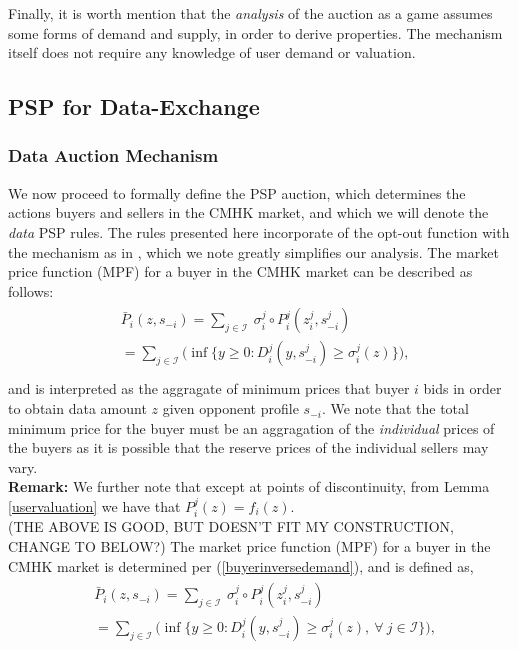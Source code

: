 \documentclass[sigconf, anonymous]{acmart}
\newcommand{\mcI}{\mathcal{I}}
\newcommand{\g}{\sigma}
\theoremstyle{definition}
\begin{document}
 
Finally, it is worth mention that the \emph{analysis} of the auction as
a game assumes some forms of demand and supply, in order to derive properties.
The mechanism itself does not require any knowledge of user demand or
valuation. 
\subsection{PSP for Data-Exchange}

\subsubsection{Data Auction Mechanism}\label{datamechanism}
We now proceed to formally define the PSP auction, which determines the actions 
buyers and sellers in the CMHK market, and which we will denote the \emph{data}
PSP rules. The rules presented here incorporate of the opt-out function with the
mechanism as in \cite{lazar}, which we note greatly simplifies our
analysis. 
The market price function (MPF) for a buyer in the CMHK market
can be described as follows:
\begin{align}\label{dataprice}
\begin{split}
    &\bar{P}_i(z, s_{-i}) =\displaystyle\sum_{j\in\mcI} \ \g_i^j \circ P_i^j(z_i^j,
s_{-i}^j) \\
    &= \sum_{j\in\mcI}\bigg(\inf\bigg\lbrace y\ge 0 : 
    {D_i^j}(y,s_{-i}^j) \ge \g_i^j(z) \bigg\rbrace \bigg),\\
\end{split}
\end{align}
and is interpreted as the aggragate of minimum prices that buyer $i$ bids in
order to obtain
data amount $z$ given opponent profile $s_{-i}$. We note that
the total minimum price for the buyer must be an aggragation of the
\emph{individual} prices of the buyers as it is possible that the reserve prices
of the individual sellers may vary.\\
\textbf{Remark:} We further note that except at points of discontinuity, from
Lemma \ref{uservaluation} we have that $P_i^j(z) = f_i(z)$. \\
(THE ABOVE IS GOOD, BUT DOESN'T FIT MY CONSTRUCTION, CHANGE TO BELOW?)
The market price function (MPF) for a buyer in the CMHK market
is determined per (\ref{buyerinversedemand}), and is defined as,
\begin{align}\label{dataprice}
\begin{split}
    &\bar{P}_i(z, s_{-i}) =\displaystyle\sum_{j\in\mcI} \ \g_i^j \circ P_i^j(z_i^j,
s_{-i}^j) \\
    &= \sum_{j\in\mcI}\bigg(\inf\bigg\lbrace y\ge 0 : 
    {D_i^j}(y,s_{-i}^j) \ge \g_i^j(z), \ \forall \ j\in\mcI \bigg\rbrace \bigg),\\
\end{split}
\end{align}
\end{document}
